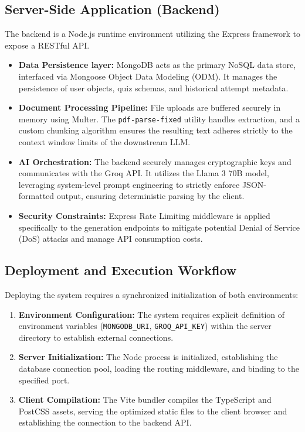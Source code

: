 \documentclass[12pt,a4paper]{article}
\begin{document}
\subsection{Server-Side Application (Backend)}
The backend is a Node.js runtime environment utilizing the Express framework to expose a RESTful API.
\begin{itemize}[leftmargin=1.5cm]
    \item \textbf{Data Persistence layer:} MongoDB acts as the primary NoSQL data store, interfaced via Mongoose Object Data Modeling (ODM). It manages the persistence of user objects, quiz schemas, and historical attempt metadata.
    \item \textbf{Document Processing Pipeline:} File uploads are buffered securely in memory using Multer. The \texttt{pdf-parse-fixed} utility handles extraction, and a custom chunking algorithm ensures the resulting text adheres strictly to the context window limits of the downstream LLM.
    \item \textbf{AI Orchestration:} The backend securely manages cryptographic keys and communicates with the Groq API. It utilizes the Llama 3 70B model, leveraging system-level prompt engineering to strictly enforce JSON-formatted output, ensuring deterministic parsing by the client.
    \item \textbf{Security Constraints:} Express Rate Limiting middleware is applied specifically to the generation endpoints to mitigate potential Denial of Service (DoS) attacks and manage API consumption costs.
\end{itemize}

\subsection{Deployment and Execution Workflow}
Deploying the system requires a synchronized initialization of both environments:
\begin{enumerate}[leftmargin=1.5cm]
    \item \textbf{Environment Configuration:} The system requires explicit definition of environment variables (\texttt{MONGODB\_URI}, \texttt{GROQ\_API\_KEY}) within the server directory to establish external connections.
    \item \textbf{Server Initialization:} The Node process is initialized, establishing the database connection pool, loading the routing middleware, and binding to the specified port.
    \item \textbf{Client Compilation:} The Vite bundler compiles the TypeScript and PostCSS assets, serving the optimized static files to the client browser and establishing the connection to the backend API.
\end{enumerate}
\end{document}
